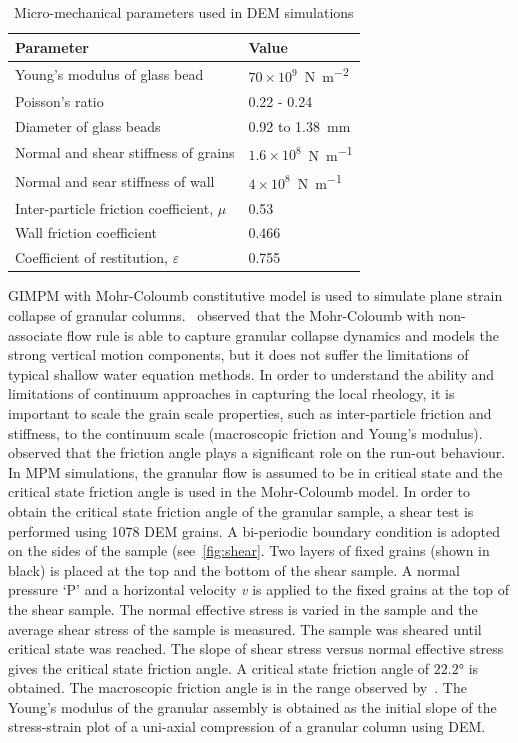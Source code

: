 \begin{table}
\caption{Micro-mechanical parameters used in DEM simulations}
\label{table:DEM_data}
\centering
\begin{tabular}{ll}
\toprule
\textbf{Parameter} & \textbf{Value} \\ \midrule
Young's modulus of glass bead & $70\times10^{9}$~\si{\newton\per\m\squared}\\ 
Poisson's ratio & 0.22 - 0.24\\ 
Diameter of glass beads & 0.92 to 1.38~\si{\mm}\\
Normal and shear stiffness of grains & $1.6 \times 10^{8}$~\si{\newton\per\m}\\ 
Normal and sear stiffness of wall & $4 \times 10^{8}$~\si{\newton\per\m}\\
Inter-particle friction coefficient, $\mu$ & 0.53 \\
Wall friction coefficient & 0.466 \\ 
Coefficient of restitution, $\varepsilon$ & 0.755 \\ \bottomrule
\end{tabular}
\end{table}

GIMPM with Mohr-Coloumb constitutive model is used to simulate plane strain 
collapse of granular columns.~\citet{Crosta2009} observed that the Mohr-Coloumb 
with non-associate flow rule is able to capture granular collapse dynamics and 
models the strong vertical motion components, but it does not suffer the 
limitations of typical shallow water equation methods. In order to understand 
the ability and limitations of continuum approaches in capturing the local 
rheology, it is important to scale the grain scale properties, such as 
inter-particle friction and stiffness, to the continuum 
scale (macroscopic friction and Young's modulus).~\citet{Crosta2009} observed 
that the friction angle plays a significant role on the run-out behaviour. In 
MPM simulations, the granular flow is assumed to be in critical state and the 
critical state friction angle is used in the Mohr-Coloumb model. In order to 
obtain the critical state friction angle of the granular sample, a shear test 
is performed using 1078 DEM grains. A bi-periodic boundary condition is adopted 
on the sides of the sample (see~\cref{fig:shear}. Two layers of fixed grains 
(shown in black) is placed at the top and the bottom of the shear sample. A 
normal pressure `P' and a horizontal velocity \textit{v} is applied to the 
fixed grains  at the top of 
the shear sample. The normal effective stress is varied in the sample and the 
average shear stress of the sample is measured. The sample was sheared until 
critical state was reached. The slope of shear stress 
versus normal effective stress gives the critical state friction angle. A 
critical state friction angle of $22.2$\si{\degree} is obtained. The 
macroscopic friction angle is in the range observed 
by~\citet{Estrada2008,Mitchell2005}. The Young's 
modulus of the granular assembly is obtained as the initial slope of the 
stress-strain plot of a uni-axial compression of a granular column using DEM.

